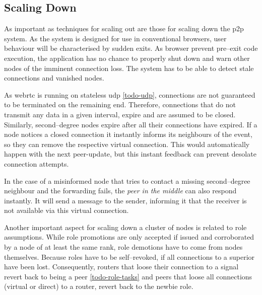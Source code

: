 \subsection{Scaling Down}
As important as techniques for scaling out are those for scaling down the \gls{p2p} system. As the system is designed for use in conventional browsers, user behaviour will be characterised by sudden exits. As browser prevent pre–exit code execution, the application has no chance to properly shut down and warn other nodes of the imminent connection loss. The system has to be able to detect stale connections and vanished nodes.

As \gls{webrtc} is running on stateless \gls{udp} \ref{todo-udp}, connections are not guaranteed to be terminated on the remaining end.
Therefore, connections that do not transmit any data in a given interval, expire and are assumed to be closed. Similarly, second–degree nodes expire after all their connections have expired.
If a node notices a closed connection it instantly informs its neighbours of the event, so they can remove the respective virtual connection. This would automatically happen with the next \gls{peer-update}, but this instant feedback can prevent desolate connection attempts.

In the case of a misinformed node that tries to contact a missing second–degree neighbour and the forwarding fails, the \textit{peer in the middle} can also respond instantly. It will send a message to the sender, informing it that the receiver is not available via this virtual connection.


Another important aspect for scaling down a cluster of nodes is related to role assumptions. While role promotions are only accepted if issued and corroborated by a node of at least the same rank, role demotions have to come from nodes themselves.
Because roles have to be self–revoked, if all connections to a superior have been lost. Consequently, routers that loose their connection to a signal revert back to being a peer \ref{todo-role-tasks} and peers that loose all connections (virtual or direct) to a router, revert back to the newbie role.
